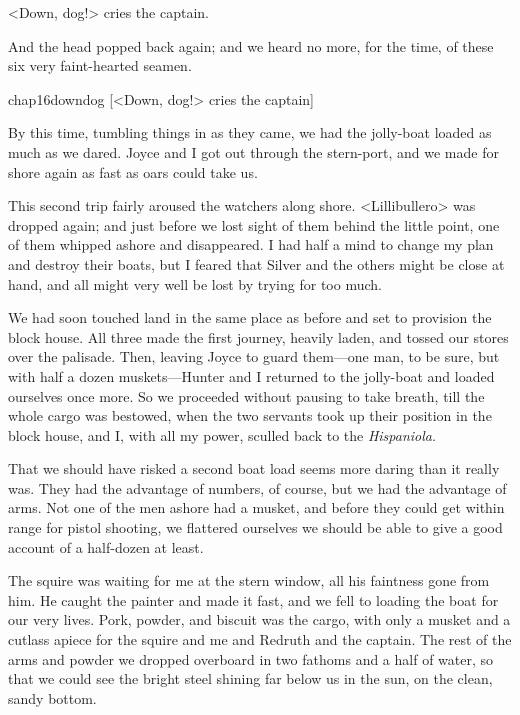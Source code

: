 <Down, dog!> cries the captain.

And the head popped back again; and we heard no more, for the time, of these six very faint-hearted seamen.

\begin{bwbigpic}
	[\basicscale]
	{chap16downdog}
	[<Down, dog!> cries the captain]
\end{bwbigpic}

By this time, tumbling things in as they came, we had the jolly-boat loaded as much as we dared. Joyce and I got out through the stern-port, and we made for shore again as fast as oars could take us.

This second trip fairly aroused the watchers along shore. <Lillibullero> was dropped again; and just before we lost sight of them behind the little point, one of them whipped ashore and disappeared. I had half a mind to change my plan and destroy their boats, but I feared that Silver and the others might be close at hand, and all might very well be lost by trying for too much.

We had soon touched land in the same place as before and set to provision the block house. All three made the first journey, heavily laden, and tossed our stores over the palisade. Then, leaving Joyce to guard them—one man, to be sure, but with half a dozen muskets—Hunter and I returned to the jolly-boat and loaded ourselves once more. So we proceeded without pausing to take breath, till the whole cargo was bestowed, when the two servants took up their position in the block house, and I, with all my power, sculled back to the \textit{Hispaniola}.

That we should have risked a second boat load seems more daring than it really was. They had the advantage of numbers, of course, but we had the advantage of arms. Not one of the men ashore had a musket, and before they could get within range for pistol shooting, we flattered ourselves we should be able to give a good account of a half-dozen at least.

The squire was waiting for me at the stern window, all his faintness gone from him. He caught the painter and made it fast, and we fell to loading the boat for our very lives. Pork, powder, and biscuit was the cargo, with only a musket and a cutlass apiece for the squire and me and Redruth and the captain. The rest of the arms and powder we dropped overboard in two fathoms and a half of water, so that we could see the bright steel shining far below us in the sun, on the clean, sandy bottom.

